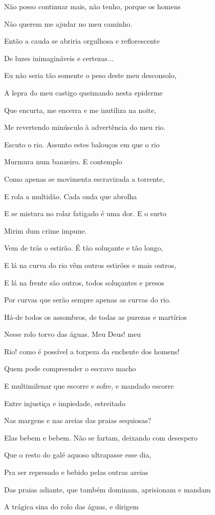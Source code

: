 Não posso continuar mais, não tenho, porque os homens

Não querem me ajudar no meu caminho.

Então a cauda se abriria orgulhosa e reflorescente

De luzes inimagináveis e certezas...

Eu não seria tão somente o peso deste meu desconsolo,

A lepra do meu castigo queimando nesta epiderme

Que encurta, me encerra e me inutiliza na noite,

Me revertendo minúsculo à advertência do meu rio.

Escuto o rio. Assunto estes balouços em que o rio

Murmura num banzeiro. E contemplo

Como apenas se movimenta escravizada a torrente,

E rola a multidão. Cada onda que abrolha

E se mistura no rolar fatigado é uma dor. E o surto

Mirim dum crime impune.

Vem de trás o estirão. É tão soluçante e tão longo,

E lá na curva do rio vêm outros estirões e mais outros,

E lá na frente são outros, todos soluçantes e presos

Por curvas que serão sempre apenas as curvas do rio.

Há-de todos os assombros, de todas as purezas e martírios

Nesse rolo torvo das águas. Meu Deus! meu

Rio! como é possível a torpeza da enchente dos homens!

Quem pode compreender o escravo macho

E multimilenar que escorre e sofre, e mandado escorre

Entre injustiça e impiedade, estreitado

Nas margens e nas areias das praias sequiosas?

Elas bebem e bebem. Não se fartam, deixando com desespero

Que o resto do galé aquoso ultrapasse esse dia,

Pra ser represado e bebido pelas outras areias

Das praias adiante, que também dominam, aprisionam e mandam

A trágica sina do rolo das águas, e dirigem

